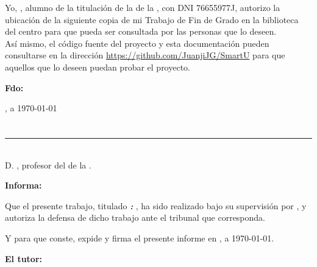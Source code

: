 {{Yo, \textbf{\autor}, alumno de la titulación \textbf{\grado} de la \textbf{\escuela} de la \textbf{\universidad}, con DNI 76655977J, autorizo la ubicación de la siguiente copia de mi Trabajo de Fin de Grado en la biblioteca del centro para que pueda ser consultada por las personas que lo deseen.\\

Así mismo, el código fuente del proyecto y esta documentación pueden consultarse en la dirección \url{https://github.com/JuanjiJG/SmartU} para que aquellos que lo deseen puedan probar el proyecto.

\vspace{5cm}

\noindent \textbf{Fdo: \autor}

\vspace{2cm}

\begin{flushright}
\ciudad, a \today
\end{flushright}

\chapter*{}
\thispagestyle{empty}

\noindent\rule[-1ex]{\textwidth}{2pt}\\[4.5ex]

D. \textbf{\tutor}, profesor del \textbf{\departamento} de la \textbf{\universidad}.

\vspace{0.5cm}

\textbf{Informa:}

\vspace{0.5cm}

Que el presente trabajo, titulado \textit{\textbf{\titulo: \subtitulo}}, ha sido realizado bajo su supervisión por \textbf{\autor}, y autoriza la defensa de dicho trabajo ante el tribunal que corresponda.

\vspace{0.5cm}

Y para que conste, expide y firma el presente informe en \ciudad, a \today.

\vspace{1cm}

\textbf{El tutor:}

\vspace{5cm}


}}
